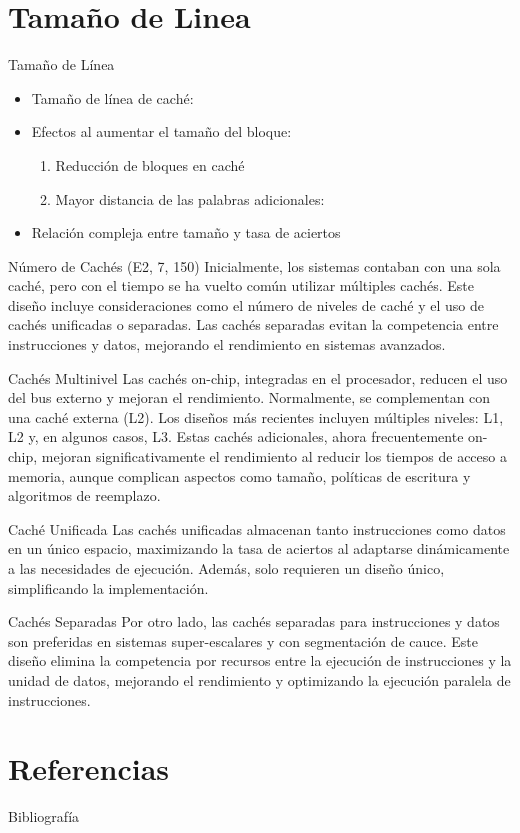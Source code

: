 \documentclass[presentation]{beamer}
\begin{document}
\section{Tamaño de Linea}
\label{sec:org0a445c7}
\begin{frame}[allowframebreaks]{Tamaño de Línea}
\begin{itemize}
\item Tamaño de línea de caché:
\item Efectos al aumentar el tamaño del bloque:
\begin{enumerate}
\item Reducción de bloques en caché
\item Mayor distancia de las palabras adicionales:
\end{enumerate}
\item Relación compleja entre tamaño y tasa de aciertos
\end{itemize}
\end{frame}
\begin{frame}[allowframebreaks]{Número de Cachés (E2, 7, 150)}
Inicialmente, los sistemas contaban con una sola caché, pero con el tiempo se ha vuelto común utilizar múltiples cachés. Este diseño incluye consideraciones como el número de niveles de caché y el uso de cachés unificadas o separadas. Las cachés separadas evitan la competencia entre instrucciones y datos, mejorando el rendimiento en sistemas avanzados.

\alert{\alert{Cachés Multinivel}}
Las cachés on-chip, integradas en el procesador, reducen el uso del bus externo y mejoran el rendimiento. Normalmente, se complementan con una caché externa (L2). Los diseños más recientes incluyen múltiples niveles: L1, L2 y, en algunos casos, L3. Estas cachés adicionales, ahora frecuentemente on-chip, mejoran significativamente el rendimiento al reducir los tiempos de acceso a memoria, aunque complican aspectos como tamaño, políticas de escritura y algoritmos de reemplazo.

\alert{\alert{Caché Unificada}}
Las cachés unificadas almacenan tanto instrucciones como datos en un único espacio, maximizando la tasa de aciertos al adaptarse dinámicamente a las necesidades de ejecución. Además, solo requieren un diseño único, simplificando la implementación.

\alert{\alert{Cachés Separadas}}
Por otro lado, las cachés separadas para instrucciones y datos son preferidas en sistemas super-escalares y con segmentación de cauce. Este diseño elimina la competencia por recursos entre la ejecución de instrucciones y la unidad de datos, mejorando el rendimiento y optimizando la ejecución paralela de instrucciones.
\end{frame}

\section{Referencias}
\label{sec:orgeea22ee}
\begin{frame}[allowframebreaks]{Bibliografía}
\printbibliography
\end{frame}
\end{document}

